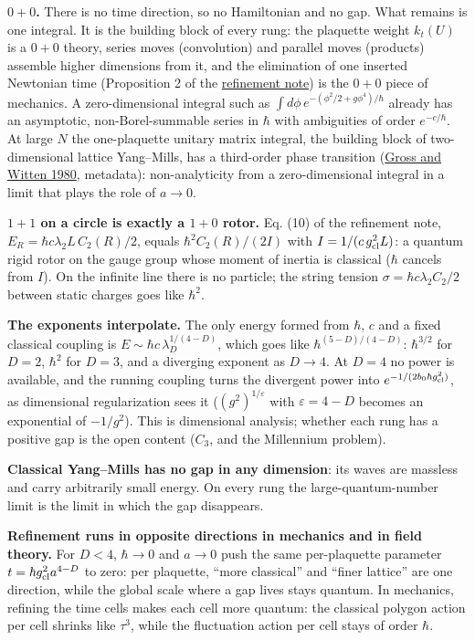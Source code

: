 \documentclass[11pt,a4paper]{article}
\begin{document}
\textbf{\(0+0\).} There is no time direction, so no Hamiltonian and no
gap. What remains is one integral. It is the building block of every
rung: the plaquette weight \(k_t(U)\) is a \(0+0\) theory, series moves
(convolution) and parallel moves (products) assemble higher dimensions
from it, and the elimination of one inserted Newtonian time (Proposition
2 of the \href{refinement-composition-and-limit.md}{refinement note}) is
the \(0+0\) piece of mechanics. A zero-dimensional integral such as
\(\int d\phi\,e^{-(\phi^2/2+g\phi^4)/\hbar}\) already has an asymptotic,
non-Borel-summable series in \(\hbar\) with ambiguities of order
\(e^{-c/\hbar}\). At large \(N\) the one-plaquette unitary matrix
integral, the building block of two-dimensional lattice Yang--Mills, has
a third-order phase transition
(\href{https://doi.org/10.1103/PhysRevD.21.446}{Gross and Witten 1980},
metadata): non-analyticity from a zero-dimensional integral in a limit
that plays the role of \(a\to0\).

\textbf{\(1+1\) on a circle is exactly a \(1+0\) rotor.} Eq. (10) of the
refinement note, \(E_R=\hbar c\lambda_2L\,C_2(R)/2\), equals
\(\hbar^2C_2(R)/(2I)\) with \(I=1/(c\,g_{\rm cl}^2L)\): a quantum rigid
rotor on the gauge group whose moment of inertia is classical (\(\hbar\)
cancels from \(I\)). On the infinite line there is no particle; the
string tension \(\sigma=\hbar c\lambda_2C_2/2\) between static charges
goes like \(\hbar^2\).

\textbf{The exponents interpolate.} The only energy formed from
\(\hbar\), \(c\) and a fixed classical coupling is
\(E\sim\hbar c\,\lambda_D^{1/(4-D)}\), which goes like
\(\hbar^{(5-D)/(4-D)}\): \(\hbar^{3/2}\) for \(D=2\), \(\hbar^2\) for
\(D=3\), and a diverging exponent as \(D\to4\). At \(D=4\) no power is
available, and the running coupling turns the divergent power into
\(e^{-1/(2b_0\hbar g_{\rm cl}^2)}\), as dimensional regularization sees
it (\((g^2)^{1/\varepsilon}\) with \(\varepsilon=4-D\) becomes an
exponential of \(-1/g^2\)). This is dimensional analysis; whether each
rung has a positive gap is the open content (\(C_3\), and the Millennium
problem).

\textbf{Classical Yang--Mills has no gap in any dimension}: its waves
are massless and carry arbitrarily small energy. On every rung the
large-quantum-number limit is the limit in which the gap disappears.

\textbf{Refinement runs in opposite directions in mechanics and in field
theory.} For \(D<4\), \(\hbar\to0\) and \(a\to0\) push the same
per-plaquette parameter \(t=\hbar g_{\rm cl}^2a^{4-D}\) to zero: per
plaquette, ``more classical'' and ``finer lattice'' are one direction,
while the global scale where a gap lives stays quantum. In mechanics,
refining the time cells makes each cell more quantum: the classical
polygon action per cell shrinks like \(\tau^3\), while the fluctuation
action per cell stays of order \(\hbar\).
\end{document}
